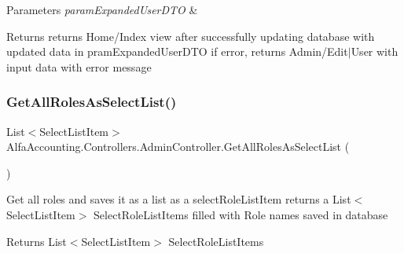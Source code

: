 \begin{DoxyParams}{Parameters}
{\em param\+Expanded\+User\+D\+TO} & \\
\hline
\end{DoxyParams}
\begin{DoxyReturn}{Returns}
returns Home/\+Index view after successfully updating database with updated data in pram\+Expanded\+User\+D\+TO if error, returns Admin/\+Edit$\vert$\+User with input data with error message 
\end{DoxyReturn}
\mbox{\label{class_alfa_accounting_1_1_controllers_1_1_admin_controller_a03803020e0e8f8234efe548a440dfb73}} 
\subsubsection{\texorpdfstring{Get\+All\+Roles\+As\+Select\+List()}{GetAllRolesAsSelectList()}}
{\footnotesize\ttfamily List$<$Select\+List\+Item$>$ Alfa\+Accounting.\+Controllers.\+Admin\+Controller.\+Get\+All\+Roles\+As\+Select\+List (\begin{DoxyParamCaption}{ }\end{DoxyParamCaption})\hspace{0.3cm}{\ttfamily [private]}}



Get all roles and saves it as a list as a select\+Role\+List\+Item returns a List$<$\+Select\+List\+Item$>$ Select\+Role\+List\+Items filled with Role names saved in database 

\begin{DoxyReturn}{Returns}
List$<$\+Select\+List\+Item$>$ Select\+Role\+List\+Items
\end{DoxyReturn}
\mbox{\label{class_alfa_accounting_1_1_controllers_1_1_admin_controller_a28a65a7e1ec9bcff2726efd067ac96a7}} 
